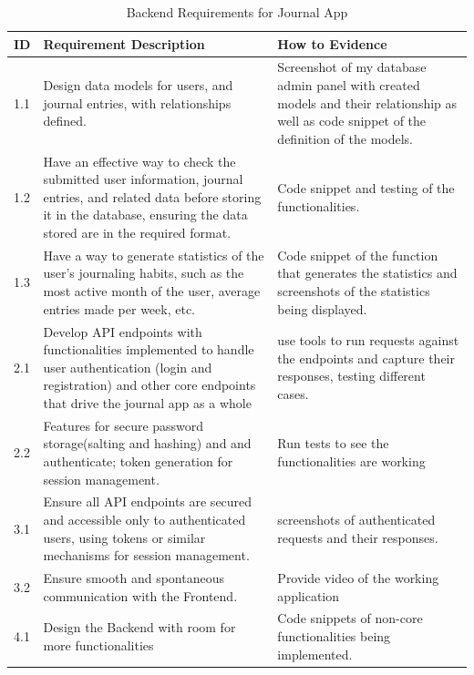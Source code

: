 \begin{table}[H]
\centering
\begin{tabular}{|l|p{8cm}|p{4cm}|}  
\hline
\textbf{ID} & \textbf{Requirement Description}& \textbf{How to Evidence} \\ \hline
1.1 & Design data models for users, and journal entries, with relationships defined. & Screenshot of my database admin panel with created models and their relationship as well as code snippet of the definition of the models. \\ \hline

1.2 & Have an effective way to check the submitted user information, journal entries, and related data before storing it in the database, ensuring the data stored are in the required format. & Code snippet and testing of the functionalities. \\ \hline

1.3 & Have a way to generate statistics of the user's journaling habits, such as the most active month of the user, average entries made per week, etc. & Code snippet of the function that generates the statistics and screenshots of the statistics being displayed. \\ \hline

2.1 & Develop API endpoints with functionalities implemented to handle user authentication (login and registration) and other core endpoints that drive the journal app as a whole & use tools to run requests against the endpoints and capture their responses, testing different cases.\\ \hline

2.2 & Features for secure password storage(salting and hashing) and and authenticate; token generation for session management.& Run tests to see the functionalities are working\\ \hline

3.1 & Ensure all API endpoints are secured and accessible only to authenticated users, using tokens or similar mechanisms for session management.& screenshots of authenticated requests and their responses. \\ \hline

3.2 & Ensure smooth and spontaneous communication with the Frontend. & Provide video of the working application \\ \hline

4.1 & Design the Backend with room for more functionalities & Code snippets of non-core functionalities being implemented. \\ \hline

\end{tabular}
\caption{Backend Requirements for Journal App}
\end{table}

